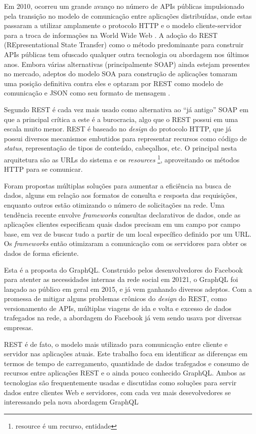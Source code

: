 Em 2010, ocorreu um grande avanço no número de APIs públicas impulsionado pela transição no modelo de comunicação entre aplicações distribuídas, onde estas passaram a utilizar amplamente o protocolo HTTP e o modelo cliente-servidor para a troca de informações na World Wide Web \cite{tcc-ufsc}. A adoção do REST (REpresentational State Transfer) como o método predominante para construir APIs públicas tem ofuscado qualquer outra tecnologia ou abordagem nos últimos anos. Embora várias alternativas (principalmente SOAP) ainda estejam presentes no mercado, adeptos do modelo SOA para construção de aplicações tomaram uma posição definitiva contra eles e optaram por REST como modelo de comunicação e JSON como seu formato de mensagem \cite{programmableweb-rest-losing}.

Segundo  REST é cada vez mais usado como alternativa ao “já antigo” SOAP em que a principal crítica a este é a burocracia, algo que o REST possui em uma escala muito menor. REST é baseado no \textit{design} do protocolo HTTP, que já possui diversos mecanismos embutidos para representar recursos como código de \textit{status}, representação de tipos de conteúdo, cabeçalhos, etc. O principal nesta arquitetura são as URLs do sistema e os \textit{resources} \footnote{resource é um recurso, entidade}, aproveitando os métodos HTTP para se comunicar.

Foram propostas múltiplas soluções para aumentar a eficiência na busca de dados, alguns em relação aos formatos de consulta e resposta das requisições, enquanto outros estão otimizando o número de solicitações na rede. Uma tendência recente envolve \textit{frameworks} consultas declarativos de dados, onde as aplicações clientes especificam quais dados precisam em um campo por campo base, em vez de buscar tudo a partir de um local específico definido por um URL. Os \textit{frameworks} então otimizaram a comunicação com os servidores para obter os dados de forma eficiente.

Esta é a proposta do GraphQL. Construido pelos desenvolvedores do Facebook para atenter as necessidades internas da rede social em 20121, o GraphQL foi lançado ao público em geral em 2015, e já vem ganhando diversos adeptos. Com a promessa de mitigar alguns problemas crônicos do \textit{design} do REST, como versionamento de APIs, múltiplas viagens de ida e volta e excesso de dados trafegados na rede, a abordagem do Facebook já vem sendo usava por diversas empresas.

REST é de fato, o modelo mais utilizado para comunicação entre cliente e servidor nas aplicações atuais. Este trabalho foca em identificar as diferenças em termos de tempo de carregamento, quantidade de dados trafegados e consumo de recursos entre aplicações REST e o ainda pouco conhecido GraphQL. Ambos as tecnologias são frequentemente usadas e discutidas como soluções para servir dados entre clientes Web e servidores, com cada vez mais desevolvedores se interessando pela nova abordagem GraphQL

